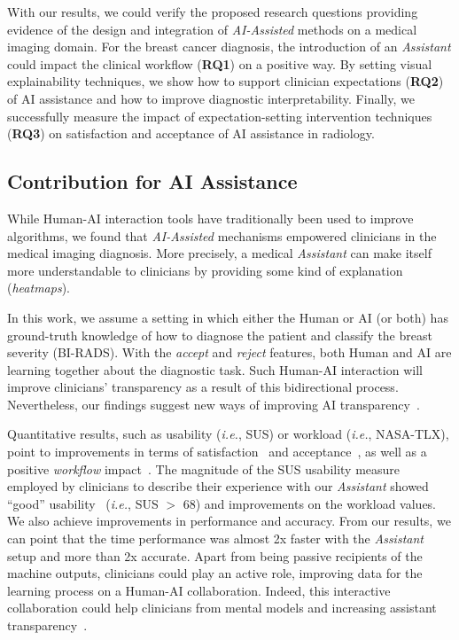 With our results, we could verify the proposed research questions providing evidence of the design and integration of {\it AI-Assisted} methods on a medical imaging domain.
For the breast cancer diagnosis, the introduction of an {\it Assistant} could impact the clinical workflow ({\bf RQ1}) on a positive way.
By setting visual explainability techniques, we show how to support clinician expectations ({\bf RQ2}) of AI assistance and how to improve diagnostic interpretability.
Finally, we successfully measure the impact of expectation-setting intervention techniques ({\bf RQ3}) on satisfaction and acceptance of AI assistance in radiology.

\subsection{Contribution for AI Assistance}

While Human-AI interaction tools have traditionally been used to improve algorithms, we found that {\it AI-Assisted} mechanisms empowered clinicians in the medical imaging diagnosis.
More precisely, a medical {\it Assistant} can make itself more understandable to clinicians by providing some kind of explanation ({\it heatmaps}).

In this work, we assume a setting in which either the Human or AI (or both) has ground-truth knowledge of how to diagnose the patient and classify the breast severity (BI-RADS).
With the {\it accept} and {\it reject} features, both Human and AI are learning together about the diagnostic task.
Such Human-AI interaction will improve clinicians' transparency as a result of this bidirectional process.
Nevertheless, our findings suggest new ways of improving AI transparency~\cite{Cai:2019:EEE:3301275.3302289}.

Quantitative results, such as usability ({\it i.e.}, SUS) or workload ({\it i.e.}, NASA-TLX), point to improvements in terms of satisfaction~\cite{Bonham:2019:ARS:3308557.3308726} and acceptance~\cite{Gambino:2019:DDR:3290607.3312916, Sonntag:2012:RMD:2166966.2167031}, as well as a positive {\it workflow} impact~\cite{DeBackere:2015:DPR:2826165.2826229}.
The magnitude of the SUS usability measure employed by clinicians to describe their experience with our {\it Assistant} showed ``good'' usability~\cite{info:doi/10.2196/18585} ({\it i.e.}, SUS $>$ 68) and improvements on the workload values.
We also achieve improvements in performance and accuracy.
From our results, we can point that the time performance was almost 2x faster with the {\it Assistant} setup and more than 2x accurate.
Apart from being passive recipients of the machine outputs, clinicians could play an active role, improving data for the learning process on a Human-AI collaboration.
Indeed, this interactive collaboration could help clinicians from mental models and increasing assistant transparency~\cite{amershi2014power, Cai:2019:HTC:3290605.3300234, Eslami:2016:FIL:2858036.2858494}.

